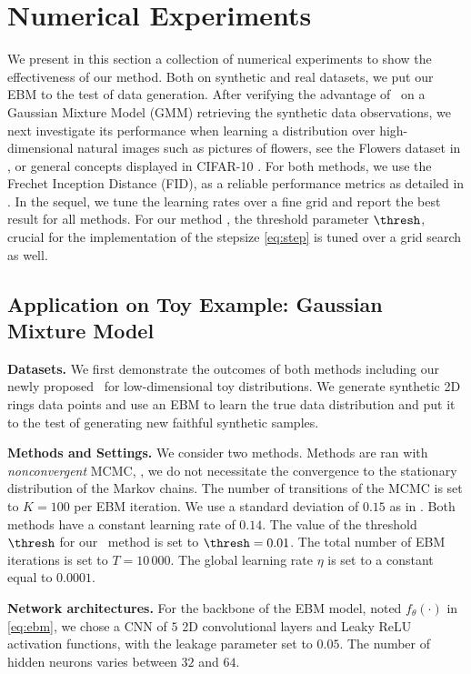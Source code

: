 \documentclass[10pt,twocolumn,letterpaper]{article}
\begin{document}
\section{Numerical Experiments}\label{sec:numericals}


We present in this section a collection of numerical experiments to show the effectiveness of our method.
Both on synthetic and real datasets, we put our EBM to the test of data generation.
After verifying the advantage of \algo\ on a Gaussian Mixture Model (GMM) retrieving the synthetic data observations, we next investigate its performance when learning a distribution over high-dimensional natural images such as pictures of flowers, see the Flowers dataset in \cite{nilsback2008automated}, or general concepts displayed in CIFAR-10 \cite{krizhevsky2009learning}.
For both methods, we use the Frechet Inception Distance (FID), as a reliable performance metrics as detailed in \cite{heusel2017gans}.
In the sequel, we tune the learning rates over a fine grid and report the best result for all methods.
For our method \algo, the threshold parameter $\thresh$, crucial for the implementation of the stepsize \eqref{eq:step} is tuned over a grid search as well.

\subsection{Application on Toy Example: Gaussian Mixture Model}

\textbf{Datasets.}
We first demonstrate the outcomes of both methods including our newly proposed \algo\ for low-dimensional toy distributions.
We generate synthetic 2D rings data points and use an EBM to learn the true data distribution and put it to the test of generating new faithful synthetic samples.

\medskip
\textbf{Methods and Settings.}
We consider two methods. 
Methods are ran with \emph{nonconvergent} MCMC, \ie, we do not necessitate the convergence to the stationary distribution of the Markov chains.
The number of transitions of the MCMC is set to $K= 100$ per EBM iteration. 
We use a standard deviation of $0.15$ as in \cite{nijkamp2020anatomy}.
Both methods have a constant learning rate of $0.14$.
The value of the threshold $\thresh$ for our \algo\ method is set to $\thresh = 0.01$.
The total number of EBM iterations is set to $T = 10\,000$.
The global learning rate $\eta$ is set to a constant equal to $0.0001$.

\medskip
\textbf{Network architectures.} 
For the backbone of the EBM model, noted $f_\theta(\cdot)$ in \eqref{eq:ebm}, we chose a CNN of $5$ 2D convolutional layers and Leaky ReLU activation functions, with the leakage parameter set to $0.05$.
The number of hidden neurons varies between $32$ and $64$.
\end{document}
